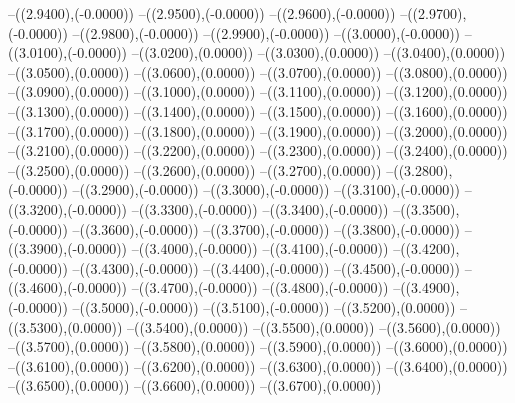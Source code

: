 {	--({\sx*(2.9400)},{\sy*(-0.0000)})
	--({\sx*(2.9500)},{\sy*(-0.0000)})
	--({\sx*(2.9600)},{\sy*(-0.0000)})
	--({\sx*(2.9700)},{\sy*(-0.0000)})
	--({\sx*(2.9800)},{\sy*(-0.0000)})
	--({\sx*(2.9900)},{\sy*(-0.0000)})
	--({\sx*(3.0000)},{\sy*(-0.0000)})
	--({\sx*(3.0100)},{\sy*(-0.0000)})
	--({\sx*(3.0200)},{\sy*(0.0000)})
	--({\sx*(3.0300)},{\sy*(0.0000)})
	--({\sx*(3.0400)},{\sy*(0.0000)})
	--({\sx*(3.0500)},{\sy*(0.0000)})
	--({\sx*(3.0600)},{\sy*(0.0000)})
	--({\sx*(3.0700)},{\sy*(0.0000)})
	--({\sx*(3.0800)},{\sy*(0.0000)})
	--({\sx*(3.0900)},{\sy*(0.0000)})
	--({\sx*(3.1000)},{\sy*(0.0000)})
	--({\sx*(3.1100)},{\sy*(0.0000)})
	--({\sx*(3.1200)},{\sy*(0.0000)})
	--({\sx*(3.1300)},{\sy*(0.0000)})
	--({\sx*(3.1400)},{\sy*(0.0000)})
	--({\sx*(3.1500)},{\sy*(0.0000)})
	--({\sx*(3.1600)},{\sy*(0.0000)})
	--({\sx*(3.1700)},{\sy*(0.0000)})
	--({\sx*(3.1800)},{\sy*(0.0000)})
	--({\sx*(3.1900)},{\sy*(0.0000)})
	--({\sx*(3.2000)},{\sy*(0.0000)})
	--({\sx*(3.2100)},{\sy*(0.0000)})
	--({\sx*(3.2200)},{\sy*(0.0000)})
	--({\sx*(3.2300)},{\sy*(0.0000)})
	--({\sx*(3.2400)},{\sy*(0.0000)})
	--({\sx*(3.2500)},{\sy*(0.0000)})
	--({\sx*(3.2600)},{\sy*(0.0000)})
	--({\sx*(3.2700)},{\sy*(0.0000)})
	--({\sx*(3.2800)},{\sy*(-0.0000)})
	--({\sx*(3.2900)},{\sy*(-0.0000)})
	--({\sx*(3.3000)},{\sy*(-0.0000)})
	--({\sx*(3.3100)},{\sy*(-0.0000)})
	--({\sx*(3.3200)},{\sy*(-0.0000)})
	--({\sx*(3.3300)},{\sy*(-0.0000)})
	--({\sx*(3.3400)},{\sy*(-0.0000)})
	--({\sx*(3.3500)},{\sy*(-0.0000)})
	--({\sx*(3.3600)},{\sy*(-0.0000)})
	--({\sx*(3.3700)},{\sy*(-0.0000)})
	--({\sx*(3.3800)},{\sy*(-0.0000)})
	--({\sx*(3.3900)},{\sy*(-0.0000)})
	--({\sx*(3.4000)},{\sy*(-0.0000)})
	--({\sx*(3.4100)},{\sy*(-0.0000)})
	--({\sx*(3.4200)},{\sy*(-0.0000)})
	--({\sx*(3.4300)},{\sy*(-0.0000)})
	--({\sx*(3.4400)},{\sy*(-0.0000)})
	--({\sx*(3.4500)},{\sy*(-0.0000)})
	--({\sx*(3.4600)},{\sy*(-0.0000)})
	--({\sx*(3.4700)},{\sy*(-0.0000)})
	--({\sx*(3.4800)},{\sy*(-0.0000)})
	--({\sx*(3.4900)},{\sy*(-0.0000)})
	--({\sx*(3.5000)},{\sy*(-0.0000)})
	--({\sx*(3.5100)},{\sy*(-0.0000)})
	--({\sx*(3.5200)},{\sy*(0.0000)})
	--({\sx*(3.5300)},{\sy*(0.0000)})
	--({\sx*(3.5400)},{\sy*(0.0000)})
	--({\sx*(3.5500)},{\sy*(0.0000)})
	--({\sx*(3.5600)},{\sy*(0.0000)})
	--({\sx*(3.5700)},{\sy*(0.0000)})
	--({\sx*(3.5800)},{\sy*(0.0000)})
	--({\sx*(3.5900)},{\sy*(0.0000)})
	--({\sx*(3.6000)},{\sy*(0.0000)})
	--({\sx*(3.6100)},{\sy*(0.0000)})
	--({\sx*(3.6200)},{\sy*(0.0000)})
	--({\sx*(3.6300)},{\sy*(0.0000)})
	--({\sx*(3.6400)},{\sy*(0.0000)})
	--({\sx*(3.6500)},{\sy*(0.0000)})
	--({\sx*(3.6600)},{\sy*(0.0000)})
	--({\sx*(3.6700)},{\sy*(0.0000)})
}
